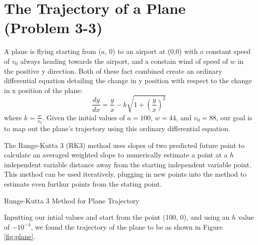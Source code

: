 \documentclass{article}
\begin{document}
\section{The Trajectory of a Plane (Problem 3-3)}
A plane is flying starting from ($a$, 0) to an airport at (0,0) with a constant speed of $v_0$ always heading towards the airport, and a constain wind of speed of $w$ in the positive y direction. Both of these fact combined create an ordinary differential equation detailing the change in y position with respect to the change in x position of the plane:
\[
\frac{dy}{dx} = \frac{y}{x}-k\sqrt{1+(\frac{y}{x})^2}
\]
where $k=\frac{w}{v_0}$. Given the initial values of $a=100$, $w=44$, and $v_0=88$, our goal is to map out the plane's trajectory using this ordinary differential equation.

The Runge-Kutta 3 (RK3) method uses slopes of two predicted future point to calculate an averaged weighted slope to numerically estimate a point at a $h$ independent variable distance away from the starting independent variable point. This method can be used iteratively, plugging in new points into the method to estimate even furthur points from the stating point. 

\begin{algorithm}
    \caption{Runge-Kutta 3 Method for Plane Trajectory}\label{alg:plane}
\end{algorithm}


Inputting our intial values and start from the point (100, 0), and using an $h$ value of $-10^{-4}$, we found the trajectory of the plane to be as shown in Figure \ref{fig:plane}.
\end{document}
